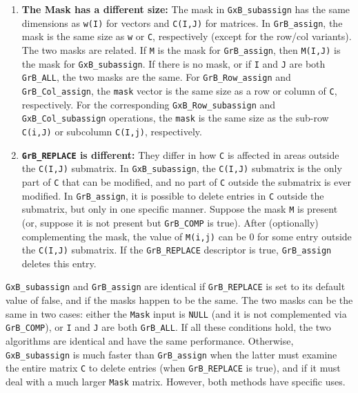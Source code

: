 \documentclass[12pt]{article}
\begin{document}
\begin{enumerate}
\item {\bf The Mask has a different size:}
    The mask in \verb'GxB_subassign' has the same dimensions as \verb'w(I)' for
    vectors and \verb'C(I,J)' for matrices.  In \verb'GrB_assign', the mask is
    the same size as \verb'w' or \verb'C', respectively (except for the row/col
    variants).  The two masks are related.  If \verb'M' is the mask for
    \verb'GrB_assign', then \verb'M(I,J)' is the mask for \verb'GxB_subassign'.
    If there is no mask, or if \verb'I' and \verb'J' are both \verb'GrB_ALL',
    the two masks are the same.
    For \verb'GrB_Row_assign' and \verb'GrB_Col_assign', the \verb'mask' vector
    is the same size as a row or column of \verb'C', respectively.  For the
    corresponding \verb'GxB_Row_subassign' and \verb'GxB_Col_subassign'
    operations, the \verb'mask' is the same size as the sub-row \verb'C(i,J)' or
    subcolumn \verb'C(I,j)', respectively.

\item {\bf \verb'GrB_REPLACE' is different:}
    They differ in how \verb'C' is affected in areas outside the \verb'C(I,J)'
    submatrix.  In \verb'GxB_subassign', the \verb'C(I,J)' submatrix is the
    only part of \verb'C' that can be modified, and no part of \verb'C' outside
    the submatrix is ever modified.  In \verb'GrB_assign', it is possible to
    delete entries in \verb'C' outside the submatrix, but only in one specific
    manner.  Suppose the mask \verb'M' is present (or, suppose it is not
    present but \verb'GrB_COMP' is true).  After (optionally) complementing the
    mask, the value of \verb'M(i,j)' can be 0 for some entry outside the
    \verb'C(I,J)' submatrix.  If the \verb'GrB_REPLACE' descriptor is
    true, \verb'GrB_assign' deletes this entry.

\end{enumerate}

\verb'GxB_subassign' and \verb'GrB_assign' are identical if \verb'GrB_REPLACE'
is set to its default value of false, and if the masks happen to be the same.
The two masks can be the same in two cases:  either the \verb'Mask' input is
\verb'NULL' (and it is not complemented via \verb'GrB_COMP'), or \verb'I' and
\verb'J' are both \verb'GrB_ALL'.
If all these conditions hold,
the two algorithms are identical and have the same performance.  Otherwise,
\verb'GxB_subassign' is much faster than \verb'GrB_assign' when the latter
must examine the entire matrix \verb'C' to delete entries (when
\verb'GrB_REPLACE' is true), and if it must deal with a much larger \verb'Mask'
matrix.  However, both methods have specific uses.
\end{document}
